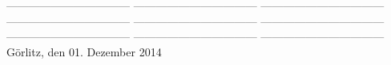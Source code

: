 \documentclass[
    11pt,               %
    a4paper,            %
    headsepline,        %
    foodsepline,        %
    cleardoubleplain,   %
    liststotoc,         %
    bibtotoc,           %
]%
{article}
\begin{document}
\vspace{2cm}\noindent
\vspace{1cm}\noindent
--------------------------------- \newline
\vspace{1cm}\noindent
--------------------------------- \newline
\vspace{1cm}\noindent
--------------------------------- \newline
\vspace{1cm}\noindent
--------------------------------- \newline
\vspace{1cm}\noindent
--------------------------------- \newline
\vspace{1cm}\noindent
--------------------------------- \newline
\vspace{1cm}\noindent
--------------------------------- \newline
\vspace{1cm}\noindent
--------------------------------- \newline
\vspace{1cm}\noindent
--------------------------------- \newline
Görlitz, den 01. Dezember 2014
\end{document}
